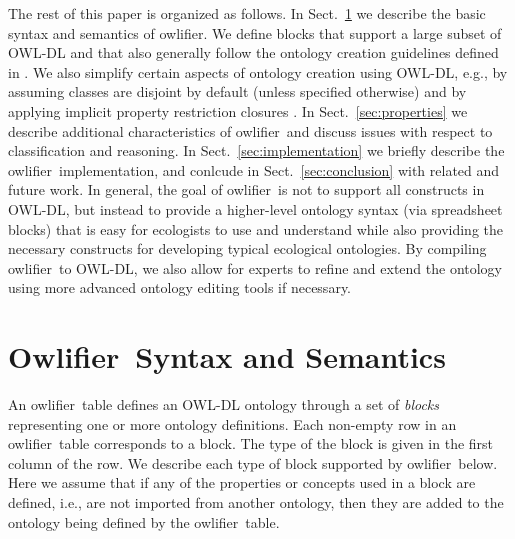 \documentclass[preprint,number]{elsarticle}
\newcommand{\Owlifier}{\textsf{Owlifier}}
\newcommand{\owlifier}{\textsf{owlifier}}
\newcommand{\secref}[1]{Sect.~\ref{#1}}
\begin{document}
The rest of this paper is organized as follows. In
\secref{sec:owlifier} we describe the basic syntax and semantics of
\owlifier. We define blocks that support a large subset of OWL-DL and
that also generally follow the ontology creation guidelines defined in
\cite{rector04:_owl_pizzas}. We also simplify certain aspects of
ontology creation using OWL-DL, e.g., by assuming classes are disjoint
by default (unless specified otherwise) and by applying implicit
property restriction closures \cite{rector04:_owl_pizzas}. In
\secref{sec:properties} we describe additional characteristics of
\owlifier\ and discuss issues with respect to classification and
reasoning. In \secref{sec:implementation} we briefly describe the
\owlifier\ implementation, and conlcude in \secref{sec:conclusion}
with related and future work. In general, the goal of \owlifier\ is
not to support all constructs in OWL-DL, but instead to provide a
higher-level ontology syntax (via spreadsheet blocks) that is easy for
ecologists to use and understand while also providing the necessary
constructs for developing typical ecological ontologies. By compiling
\owlifier\ to OWL-DL, we also allow for experts to refine and extend
the ontology using more advanced ontology editing tools if necessary.



\section{\Owlifier\ Syntax and Semantics}
\label{sec:owlifier}

An \owlifier\ table defines an OWL-DL
\cite{smith04:_owl_web_ontol_languag_guide} ontology through a set of
\emph{blocks} representing one or more ontology definitions.  Each
non-empty row in an \owlifier\ table corresponds to a block. The type
of the block is given in the first column of the row. We describe each
type of block supported by \owlifier\ below. Here we assume that if
any of the properties or concepts used in a block are defined, i.e.,
are not imported from another ontology, then they are added to the
ontology being defined by the \owlifier\ table.
\end{document}

